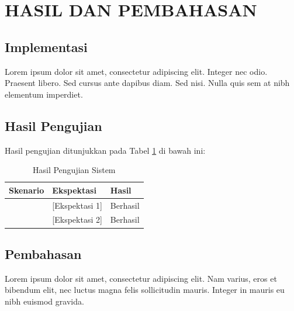 \section{HASIL DAN PEMBAHASAN}
\onehalfspacing

\subsection{Implementasi}
\justifying

Lorem ipsum dolor sit amet, consectetur adipiscing elit. Integer nec odio. Praesent libero. Sed cursus ante dapibus diam. Sed nisi. Nulla quis sem at nibh elementum imperdiet.

\subsection{Hasil Pengujian}
\justifying

Hasil pengujian ditunjukkan pada Tabel \ref{tab:hasil_pengujian} di bawah ini:

\begin{table}[H]
    \centering
    \caption{Hasil Pengujian Sistem}
    \begin{tabular}{|l|l|l|}
    \hline
    \textbf{Skenario} & \textbf{Ekspektasi} & \textbf{Hasil} \\ \hline
    [Skenario 1] & [Ekspektasi 1] & Berhasil \\ \hline
    [Skenario 2] & [Ekspektasi 2] & Berhasil \\ \hline
    \end{tabular}
    \label{tab:hasil_pengujian}
\end{table}

\subsection{Pembahasan}
\justifying

Lorem ipsum dolor sit amet, consectetur adipiscing elit. Nam varius, eros et bibendum elit, nec luctus magna felis sollicitudin mauris. Integer in mauris eu nibh euismod gravida.
